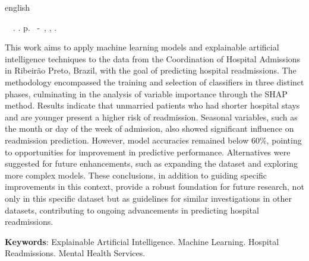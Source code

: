 \begin{resumo}[Abstract]
 \begin{otherlanguage*}{english}
	\begin{flushleft} 
		\setlength{\absparsep}{0pt} %
 		\SingleSpacing  		\imprimirautorabr~~\textbf{\imprimirtitleabstract}.	\imprimirdata.  \pageref{LastPage}p. 
		\imprimirtipotrabalhoabs~-~\imprimirinstituicao, \imprimirlocal, 	\imprimirdata. 
 	\end{flushleft}
	\OnehalfSpacing 
	This work aims to apply machine learning models and explainable artificial intelligence techniques to the data from the Coordination of Hospital Admissions in Ribeirão Preto, Brazil, with the goal of predicting hospital readmissions. The methodology encompassed the training and selection of classifiers in three distinct phases, culminating in the analysis of variable importance through the SHAP method. Results indicate that unmarried patients who had shorter hospital stays and are younger present a higher risk of readmission. Seasonal variables, such as the month or day of the week of admission, also showed significant influence on readmission prediction. However, model accuracies remained below 60\%, pointing to opportunities for improvement in predictive performance. Alternatives were suggested for future enhancements, such as expanding the dataset and exploring more complex models. These conclusions, in addition to guiding specific improvements in this context, provide a robust foundation for future research, not only in this specific dataset but as guidelines for similar investigations in other datasets, contributing to ongoing advancements in predicting hospital readmissions.
	
	\vspace{\onelineskip}
	\noindent 
	\textbf{Keywords}: Explainable Artificial Intelligence. Machine Learning. Hospital Readmissions. Mental Health Services.
 \end{otherlanguage*}
\end{resumo}